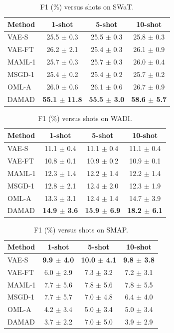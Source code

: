 \begin{table}[t]
\centering
\small
\caption{F1 (\%) versus shots on SWaT.}
\label{tab:shots_swat}
\begin{tabular}{lccc}
\toprule
Method & 1-shot & 5-shot & 10-shot \\
\midrule
VAE-S & 25.5 $\pm$ 0.3 & 25.5 $\pm$ 0.3 & 25.8 $\pm$ 0.3 \\
VAE-FT & 26.2 $\pm$ 2.1 & 25.4 $\pm$ 0.3 & 26.1 $\pm$ 0.9 \\
MAML-1 & 25.7 $\pm$ 0.3 & 25.7 $\pm$ 0.3 & 26.0 $\pm$ 0.4 \\
MSGD-1 & 25.4 $\pm$ 0.2 & 25.4 $\pm$ 0.2 & 25.7 $\pm$ 0.2 \\
OML-A & 26.0 $\pm$ 0.6 & 26.1 $\pm$ 0.6 & 26.7 $\pm$ 0.9 \\
DAMAD & \textbf{55.1 $\pm$ 11.8} & \textbf{55.5 $\pm$ 3.0} & \textbf{58.6 $\pm$ 5.7} \\
\bottomrule
\end{tabular}
\end{table}

\begin{table}[t]
\centering
\small
\caption{F1 (\%) versus shots on WADI.}
\label{tab:shots_wadi}
\begin{tabular}{lccc}
\toprule
Method & 1-shot & 5-shot & 10-shot \\
\midrule
VAE-S & 11.1 $\pm$ 0.4 & 11.1 $\pm$ 0.4 & 11.1 $\pm$ 0.4 \\
VAE-FT & 10.8 $\pm$ 0.1 & 10.9 $\pm$ 0.2 & 10.9 $\pm$ 0.1 \\
MAML-1 & 12.3 $\pm$ 1.4 & 12.2 $\pm$ 1.4 & 12.2 $\pm$ 1.4 \\
MSGD-1 & 12.8 $\pm$ 2.1 & 12.4 $\pm$ 2.0 & 12.3 $\pm$ 1.9 \\
OML-A & 13.3 $\pm$ 3.1 & 12.4 $\pm$ 1.4 & 14.7 $\pm$ 3.9 \\
DAMAD & \textbf{14.9 $\pm$ 3.6} & \textbf{15.9 $\pm$ 6.9} & \textbf{18.2 $\pm$ 6.1} \\
\bottomrule
\end{tabular}
\end{table}

\begin{table}[t]
\centering
\small
\caption{F1 (\%) versus shots on SMAP.}
\label{tab:shots_smap}
\begin{tabular}{lccc}
\toprule
Method & 1-shot & 5-shot & 10-shot \\
\midrule
VAE-S & \textbf{9.9 $\pm$ 4.0} & \textbf{10.0 $\pm$ 4.1} & \textbf{9.8 $\pm$ 3.8} \\
VAE-FT & 6.0 $\pm$ 2.9 & 7.3 $\pm$ 3.2 & 7.2 $\pm$ 3.1 \\
MAML-1 & 7.7 $\pm$ 5.6 & 7.8 $\pm$ 5.6 & 7.8 $\pm$ 5.5 \\
MSGD-1 & 7.7 $\pm$ 5.7 & 7.0 $\pm$ 4.8 & 6.4 $\pm$ 4.0 \\
OML-A & 4.2 $\pm$ 3.4 & 5.0 $\pm$ 3.4 & 5.0 $\pm$ 3.4 \\
DAMAD & 3.7 $\pm$ 2.2 & 7.0 $\pm$ 5.0 & 3.9 $\pm$ 2.9 \\
\bottomrule
\end{tabular}
\end{table}

